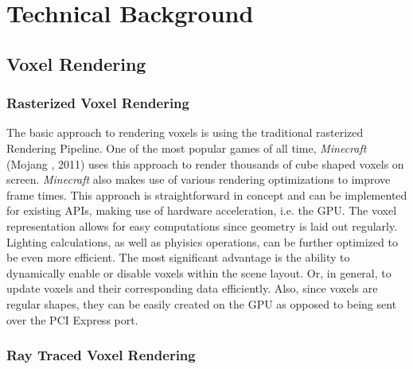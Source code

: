 \chapter{Technical Background} \label{cpt-technical-background}


\section{Voxel Rendering} \label{sec-voxel-rendering}


\subsection*{Rasterized Voxel Rendering} \label{subsec-rasterized-voxel-rendering}

The basic approach to rendering voxels is using the traditional rasterized Rendering Pipeline.
One of the most popular games of all time, \emph{Minecraft} (Mojang \cite{Mojang2024}, 2011) uses 
this approach to render thousands of cube shaped voxels on screen. \emph{Minecraft} also makes use 
of various rendering optimizations to improve frame times. This approach is straightforward in 
concept and can be implemented for existing \ac{API}s, making use of hardware acceleration, i.e. 
the \ac{GPU}. The voxel representation allows for easy computations since geometry is laid out 
regularly. Lighting calculations, as well as phyisics operations, can be further optimized to 
be even more efficient. The most significant advantage is the ability to dynamically enable or 
disable voxels within the scene layout. Or, in general, to update voxels and their corresponding 
data efficiently. Also, since voxels are regular shapes, they can be easily created on the \ac{GPU} 
as opposed to being sent over the \ac{PCI Express} port. 


\subsection*{Ray Traced Voxel Rendering} \label{subsec-ray-traced-voxel-rendering}

